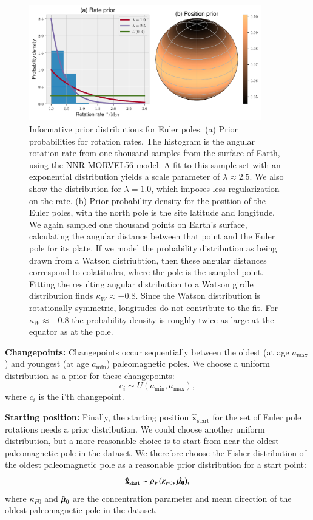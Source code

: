 \documentclass[preprint,12pt,authoryear]{elsarticle}
\newcommand{\mitbf}[1]{\hbox{\mathversion{bold}$#1$}}
\begin{document}
\begin{figure}
\includegraphics[width=0.9\textwidth]{figures/euler_pole_prior/euler_pole_prior.pdf}
\caption[Informative prior distributions for Euler poles]{Informative prior distributions for Euler poles. (a) Prior probabilities for rotation rates. The histogram is the angular rotation rate from one thousand samples from the surface of Earth, using the NNR-MORVEL56 model. A fit to this sample set with an exponential distribution yields a scale parameter of $\lambda \approx 2.5$. We also show the distribution for $\lambda = 1.0$, which imposes less regularization on the rate. 
(b) Prior probability density for the position of the Euler poles, with the north pole is the site latitude and longitude. 
We again sampled one thousand points on Earth's surface, calculating the angular distance between that point and the Euler pole for its plate. 
If we model the probability distribution as being drawn from a Watson distriubtion, then these angular distances correspond to colatitudes, where the pole is the sampled point. 
Fitting the resulting angular distribution to a Watson girdle distribution finds $\kappa_W \approx -0.8$. 
Since the Watson distribution is rotationally symmetric, longitudes do not contribute to the fit. 
For $\kappa_W \approx -0.8$ the probability density is roughly twice as large at the equator as at the pole.}
\label{fig:euler_pole_prior}
\end{figure}

\textbf{Changepoints:} 
Changepoints occur sequentially between the oldest (at age $a_\mathrm{max}$) and
youngest (at age $a_\mathrm{min}$) paleomagnetic poles.
We choose a uniform distribution as a prior for these changepoints:
\begin{equation}
c_i \sim U( a_\mathrm{min}, a_\mathrm{max}),
\end{equation}
where $c_i$ is the i'th changepoint.

\textbf{Starting position:}
Finally, the starting position $\hat{\mathbf{x}}_\mathrm{start}$ for the set of Euler pole rotations needs a prior distribution.
We could choose another uniform distribution, but a more reasonable choice
is to start from near the oldest paleomagnetic pole in the dataset.
We therefore choose the Fisher distribution of the oldest paleomagnetic pole as a reasonable prior distribution for a start point:
\begin{equation}
\hat{\mathbf{x}}_\mathrm{start} \sim \rho_F(\kappa_{F0}, \hat{\mitbf{\mu_0}}),
\end{equation}
where $\kappa_{F0}$ and $\hat{\mitbf{\mu}}_0$ are the concentration parameter and mean direction
of the oldest paleomagnetic pole in the dataset.
\end{document}
